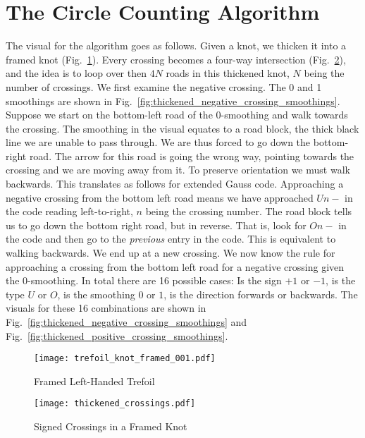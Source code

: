 \documentclass{article}
\theoremstyle{plain}
\begin{document}
    \section{The Circle Counting Algorithm}
        The visual for the algorithm goes as follows. Given a knot, we thicken
        it into a framed knot (Fig.~\ref{fig:trefoil_knot_framed_001}). Every
        crossing becomes a four-way intersection
        (Fig.~\ref{fig:thickened_crossings}), and the idea is to loop
        over then $4N$ roads in this thickened knot, $N$ being the number of
        crossings. We first examine the negative crossing. The 0 and 1
        smoothings are shown in
        Fig.~\ref{fig:thickened_negative_crossing_smoothings}. Suppose we start
        on the bottom-left road of the 0-smoothing and walk towards the
        crossing. The smoothing in the visual equates to a road block, the thick
        black line we are unable to pass through. We are thus forced to go down
        the bottom-right road. The arrow for this road is going the wrong way,
        pointing towards the crossing and we are moving away from it.
        To preserve orientation we must walk backwards. This
        translates as follows for extended Gauss code. Approaching a negative
        crossing from the bottom left road means we have approached $Un-$ in
        the code reading left-to-right, $n$ being the crossing number. The
        road block tells us to go down the bottom right road, but in reverse.
        That is, look for $On-$ in the code and then go
        to the \textit{previous} entry in the code.
        This is equivalent to walking backwards. We end up at a new crossing.
        We now know the rule for approaching a crossing from the bottom left
        road for a negative crossing given the 0-smoothing. In total there are
        16 possible cases: Is the sign $+1$ or $-1$, is the type $U$ or $O$, is
        the smoothing $0$ or $1$, is the direction forwards or backwards. The
        visuals for these 16 combinations are shown in
        Fig.~\ref{fig:thickened_negative_crossing_smoothings} and
        Fig.~\ref{fig:thickened_positive_crossing_smoothings}.
        \par\hfill\par
        \begin{figure}
            \centering
            \texttt{[image: trefoil\_knot\_framed\_001.pdf]}
            \caption{Framed Left-Handed Trefoil}
            \label{fig:trefoil_knot_framed_001}
        \end{figure}
        \begin{figure}
            \centering
            \texttt{[image: thickened\_crossings.pdf]}
            \caption{Signed Crossings in a Framed Knot}
            \label{fig:thickened_crossings}
        \end{figure}
\end{document}
